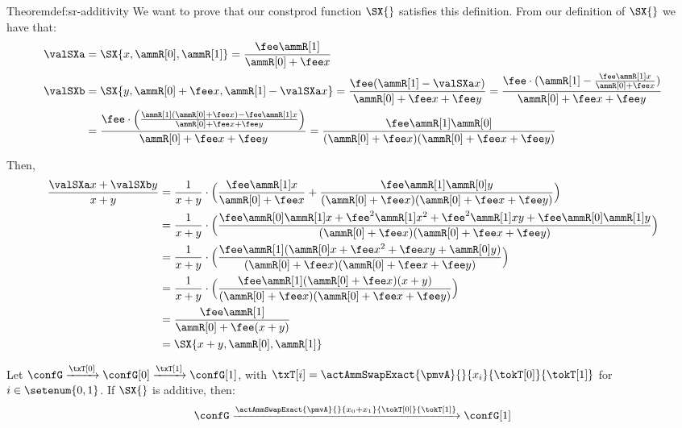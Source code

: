 \begin{proofof}{Theorem}{def:sr-additivity}
    We want to prove that our constprod function $\SX{}$ satisfies this definition. From our definition of $\SX{}$ we have that: 
    \begin{align*}
    \valSXa 
    & = \SX{x,\ammR[0],\ammR[1]} = \frac{\fee \ammR[1]}{\ammR[0]+\fee x}
    \\
    \valSXb 
    & = \SX{y,\ammR[0]+\fee x,\ammR[1]-\valSXa x}
      = \frac{\fee (\ammR[1]-\valSXa x)}{\ammR[0]+\fee x+ \fee y}
      = \frac{\fee \cdot (\ammR[1] - \frac{\fee \ammR[1] x}{\ammR[0] + \fee x})}{\ammR[0] + \fee x + \fee y}
    \\
    & = \frac{\fee \cdot \Big ( \frac{\ammR[1](\ammR[0] + \fee x) - \fee \ammR[1] x}{\ammR[0] + \fee x + \fee y}\Big )}{\ammR[0] + \fee x + \fee y}
      = \frac{\fee \ammR[1] \ammR[0]}{(\ammR[0] + \fee x)(\ammR[0] + \fee x + \fee y)}
  \end{align*}

  Then, 
  \begin{align*}
      \frac{\valSXa x + \valSXb y}{x+y} 
      & = \frac{1}{x + y} \cdot \Big ( 
          \frac{\fee \ammR[1] x}{\ammR[0] + \fee x} + 
          \frac{\fee \ammR[1] \ammR[0] y}{(\ammR[0] + \fee x)(\ammR[0] + \fee x + \fee y)}
          \Big )
    \\
     & = \frac{1}{x + y} \cdot \Big ( 
         \frac{\fee \ammR[0] \ammR[1] x + \fee^2 \ammR[1] x^2 + \fee^2 \ammR[1] x y + \fee \ammR[0] \ammR[1] y}{(\ammR[0] + \fee x)(\ammR[0] + \fee x + \fee y)}
         \Big )
    \\
     & = \frac{1}{x + y} \cdot \Big ( 
         \frac{\fee \ammR[1] (\ammR[0] x + \fee x^2 + \fee x y + \ammR[0] y)}
              {(\ammR[0] + \fee x)(\ammR[0] + \fee x + \fee y)}
         \Big )
    \\
     & = \frac{1}{x + y} \cdot \Big ( 
         \frac{\fee \ammR[1] (\ammR[0] + \fee x)(x + y)}
              {(\ammR[0] + \fee x)(\ammR[0] + \fee x + \fee y)}
         \Big )
    \\
     & = \frac{\fee \ammR[1]}{\ammR[0] + \fee(x + y)}
    \\
     & = \SX{x+y, \ammR[0], \ammR[1]}
  \end{align*}
\end{proofof}

\newpage

\begin{thm}
  \label{thm:sr-additivity}
  Let $\confG \xrightarrow{\txT[0]} \confG[0] \xrightarrow{\txT[1]} \confG[1]$,
  with
  \mbox{$\txT[i] = \actAmmSwapExact{\pmvA}{}{x_i}{\tokT[0]}{\tokT[1]}$} 
  for $i \in \setenum{0,1}$.
  If $\SX{}$ is additive, then:
  \[
    \confG \xrightarrow{\actAmmSwapExact{\pmvA}{}{x_0+x_1}{\tokT[0]}{\tokT[1]}} \confG[1]
  \]
\end{thm}

